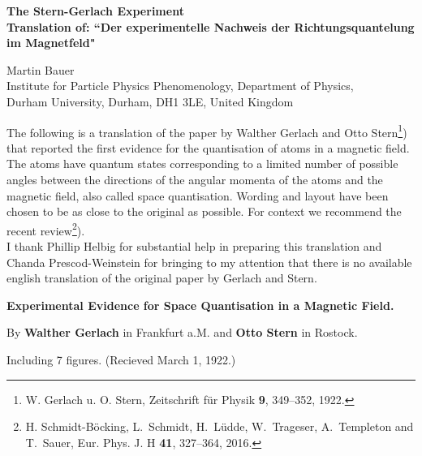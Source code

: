 \documentclass[11pt]{article}
\begin{document}
\begin{center}
\Large\bf\boldmath
The Stern-Gerlach Experiment\\
Translation of: ``Der experimentelle Nachweis der Richtungsquantelung im Magnetfeld" \,\end{center}
\begin{center}
Martin Bauer\\%
Institute for Particle Physics Phenomenology, Department of Physics,\\
Durham University, Durham, DH1 3LE, United Kingdom\\[2mm]
\end{center}

The following is a translation of the paper by Walther Gerlach and Otto Stern\footnote{W. Gerlach u. O. Stern, Zeitschrift f{\"u}r Physik \textbf{9}, 349--352, 1922.}) that reported the first evidence for the quantisation of atoms in a magnetic field. The atoms have quantum states corresponding to a limited number of possible angles between the directions of the angular momenta of the atoms and the magnetic field, also called space quantisation. Wording and layout have been chosen to be as close to the original as possible. For context we recommend the recent review\footnote{H. Schmidt-B{\"o}cking, L.~Schmidt, H.~L{\"u}dde,  W.~Trageser, A.~Templeton and T.~Sauer, Eur. Phys. J. H \textbf{41}, 327--364, 2016.}). \\
I thank Phillip Helbig for substantial help in preparing this translation and Chanda Prescod-Weinstein for bringing to my attention that there is no available english translation of the original paper by Gerlach and Stern.





\newpage

\vspace{0.5cm}
\begin{center}
\Large\bf\boldmath
Experimental Evidence for Space Quantisation in a Magnetic Field.
\end{center}
\begin{center}By  \textbf{Walther Gerlach} in Frankfurt a.M.  and \textbf{Otto Stern} in Rostock. \end{center}
\begin{center}Including 7 figures. (Recieved March 1, 1922.)
\end{center}
 
\end{document}
